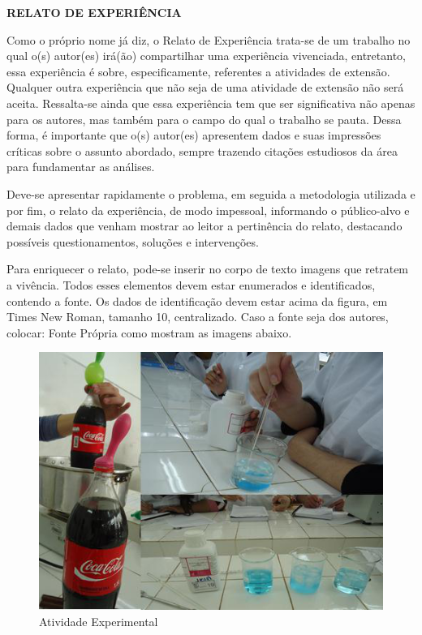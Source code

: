 \begin{OnehalfSpace}

    \noindent\textbf{RELATO DE EXPERIÊNCIA} 

    Como o próprio nome já diz, o Relato de Experiência trata-se de um trabalho no qual o(s) autor(es) irá(ão) compartilhar uma experiência vivenciada, entretanto, essa experiência é sobre, especificamente, referentes a atividades de extensão. Qualquer outra experiência que não seja de uma atividade de extensão não será aceita. Ressalta-se ainda que essa experiência tem que ser significativa não apenas para os autores, mas também para o campo do qual o trabalho se pauta. Dessa forma, é importante que o(s) autor(es) apresentem dados e suas impressões críticas sobre o assunto abordado, sempre trazendo citações estudiosos da área para fundamentar as análises.

    Deve-se apresentar rapidamente o problema, em seguida a metodologia utilizada e por fim, o relato da experiência, de modo impessoal, informando o público-alvo e demais dados que venham mostrar ao leitor a pertinência do relato, destacando possíveis questionamentos, soluções e intervenções.

    Para enriquecer o relato, pode-se inserir no corpo de texto imagens que retratem a vivência. Todos esses elementos devem estar enumerados e identificados, contendo a fonte. Os dados de identificação devem estar acima da figura, em Times New Roman, tamanho 10, centralizado. Caso a fonte seja dos autores, colocar: Fonte Própria como mostram as imagens abaixo.

    \begin{figure}[H]
        \centering
        \caption{Atividade Experimental}
        \includegraphics{img/figurateste.png}

        \label{figura}
    \end{figure}

\end{OnehalfSpace}